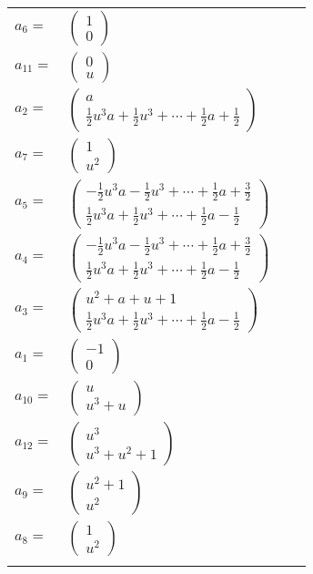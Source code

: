 \documentclass[1p]{elsarticle_modified}
\theoremstyle{definition}
\begin{document}
\begin{tabular}{m{7pt} m{180pt} m{7pt} m{180pt} }
\flushright $a_{6}=$&$\begin{pmatrix}1\\0\end{pmatrix}$ \\
\flushright $a_{11}=$&$\begin{pmatrix}0\\u\end{pmatrix}$ \\
\flushright $a_{2}=$&$\begin{pmatrix}a\\\frac{1}{2} u^3 a+\frac{1}{2} u^3+\cdots+\frac{1}{2} a+\frac{1}{2}\end{pmatrix}$ \\
\flushright $a_{7}=$&$\begin{pmatrix}1\\u^2\end{pmatrix}$ \\
\flushright $a_{5}=$&$\begin{pmatrix}-\frac{1}{2} u^3 a-\frac{1}{2} u^3+\cdots+\frac{1}{2} a+\frac{3}{2}\\\frac{1}{2} u^3 a+\frac{1}{2} u^3+\cdots+\frac{1}{2} a-\frac{1}{2}\end{pmatrix}$ \\
\flushright $a_{4}=$&$\begin{pmatrix}-\frac{1}{2} u^3 a-\frac{1}{2} u^3+\cdots+\frac{1}{2} a+\frac{3}{2}\\\frac{1}{2} u^3 a+\frac{1}{2} u^3+\cdots+\frac{1}{2} a-\frac{1}{2}\end{pmatrix}$ \\
\flushright $a_{3}=$&$\begin{pmatrix}u^2+a+u+1\\\frac{1}{2} u^3 a+\frac{1}{2} u^3+\cdots+\frac{1}{2} a-\frac{1}{2}\end{pmatrix}$ \\
\flushright $a_{1}=$&$\begin{pmatrix}-1\\0\end{pmatrix}$ \\
\flushright $a_{10}=$&$\begin{pmatrix}u\\u^3+u\end{pmatrix}$ \\
\flushright $a_{12}=$&$\begin{pmatrix}u^3\\u^3+u^2+1\end{pmatrix}$ \\
\flushright $a_{9}=$&$\begin{pmatrix}u^2+1\\u^2\end{pmatrix}$ \\
\flushright $a_{8}=$&$\begin{pmatrix}1\\u^2\end{pmatrix}$\\&\end{tabular}
\end{document}
